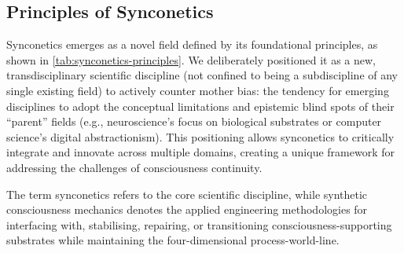 \documentclass[10pt]{article}
\begin{document}
\begin{sloppypar}
  \subsection{Principles of Synconetics}
  \label{sec:principles}

  Synconetics emerges as a novel field defined by its foundational principles, as shown in \autoref{tab:synconetics-principles}. We deliberately positioned it as a new, transdisciplinary scientific discipline (not confined to being a subdiscipline of any single existing field) to actively counter mother bias: the tendency for emerging disciplines to adopt the conceptual limitations and epistemic blind spots of their “parent” fields (e.g., neuroscience’s focus on biological substrates or computer science’s digital abstractionism). This positioning allows synconetics to critically integrate and innovate across multiple domains, creating a unique framework for addressing the challenges of consciousness continuity.

  The term synconetics refers to the core scientific discipline, while synthetic consciousness mechanics denotes the applied engineering methodologies for interfacing with, stabilising, repairing, or transitioning consciousness-supporting substrates while maintaining the four-dimensional process-world-line.


\end{sloppypar}
\end{document}
